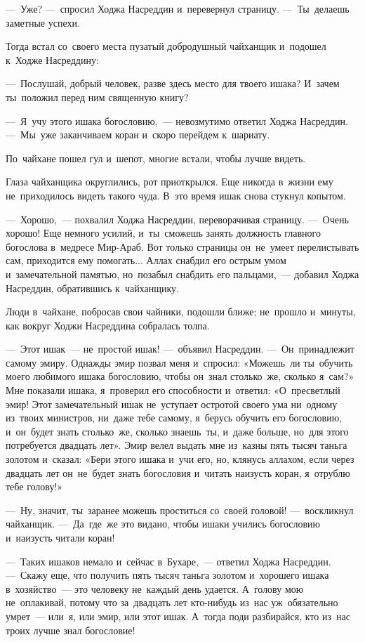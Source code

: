 \documentclass[12pt,a4paper]{book}
\begin{document}
—~Уже? —~спросил Ходжа Насреддин и~перевернул страницу. —~Ты~делаешь заметные успехи.

Тогда встал со~своего места пузатый добродушный чайханщик и~подошел к~Ходже Насреддину:

—~Послушай, добрый человек, разве здесь место для твоего ишака? И~зачем ты~положил перед ним священную книгу?

—~Я~учу этого ишака богословию,~— невозмутимо ответил Ходжа Насреддин. —~Мы~уже заканчиваем коран и~скоро перейдем к~шариату.

По~чайхане пошел гул и~шепот, многие встали, чтобы лучше видеть.

Глаза чайханщика округлились, рот приоткрылся. Еще никогда в~жизни ему не~приходилось видеть такого чуда. В~это время ишак снова стукнул копытом.

—~Хорошо,~— похвалил Ходжа Насреддин, переворачивая страницу. —~Очень хорошо! Еще немного усилий, и~ты~сможешь занять должность главного богослова в~медресе Мир-Араб. Вот только страницы он~не~умеет перелистывать сам, приходится ему помогать... Аллах снабдил его острым умом и~замечательной памятью, но~позабыл снабдить его пальцами,~— добавил Ходжа Насреддин, обратившись к~чайханщику.

Люди в~чайхане, побросав свои чайники, подошли ближе; не~прошло и~минуты, как вокруг Ходжи Насреддина собралась толпа.

—~Этот ишак~— не~простой ишак! —~объявил Насреддин. —~Он~принадлежит самому эмиру. Однажды эмир позвал меня и~спросил: «Можешь~ли ты~обучить моего любимого ишака богословию, чтобы он~знал столько~же, сколько я~сам?» Мне показали ишака, я~проверил его способности и~ответил: «О~пресветлый эмир! Этот замечательный ишак не~уступает остротой своего ума ни~одному из~твоих министров, ни~даже тебе самому, я~берусь обучить его богословию, и~он~будет знать столько~же, сколько знаешь~ты, и~даже больше, но~для этого потребуется двадцать лет». Эмир велел выдать мне из~казны пять тысяч таньга золотом и~сказал: «Бери этого ишака и~учи его, но, клянусь аллахом, если через двадцать лет он~не~будет знать богословия и~читать наизусть коран, я~отрублю тебе голову!»

—~Ну, значит, ты~заранее можешь проститься со~своей головой! —~воскликнул чайханщик. —~Да~где~же это видано, чтобы ишаки учились богословию и~наизусть читали коран!

—~Таких ишаков немало и~сейчас в~Бухаре,~— ответил Ходжа Насреддин. —~Скажу еще, что получить пять тысяч таньга золотом и~хорошего ишака в~хозяйство~— это человеку не~каждый день удается. А~голову мою не~оплакивай, потому что за~двадцать лет кто-нибудь из~нас уж~обязательно умрет~— или~я, или эмир, или этот ишак. А~тогда поди разбирайся, кто из~нас троих лучше знал богословие!
\end{document}
